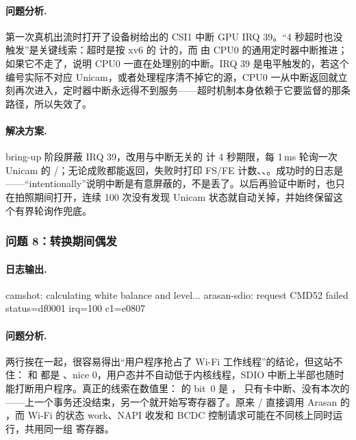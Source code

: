 \paragraph{问题分析.} 第一次真机出流时打开了设备树给出的 CSI1 中断 GPU IRQ 39。“4 秒超时也没触发”是关键线索：超时是按 xv6 的  计的，而  由 CPU0 的通用定时器中断推进；如果它不走了，说明 CPU0 一直在处理别的中断。IRQ 39 是电平触发的，若这个编号实际不对应 Unicam，或者处理程序清不掉它的源，CPU0 一从中断返回就立刻再次进入，定时器中断永远得不到服务——超时机制本身依赖于它要监督的那条路径，所以失效了。

\paragraph{解决方案.} bring-up 阶段屏蔽 IRQ 39，改用与中断无关的  计 4 秒期限，每 1\,ms 轮询一次 Unicam 的 /；无论成败都能返回，失败时打印 FS/FE 计数、、。成功时的日志是 ——“intentionally”说明中断是有意屏蔽的，不是丢了。以后再验证中断时，也只在拍照期间打开，连续 100 次没有发现 Unicam 状态就自动关掉，并始终保留这个有界轮询作兜底。

\subsubsection{问题 8：转换期间偶发 }

\paragraph{日志输出.}
\begin{txtcode}
camshot: calculating white balance and level...
arasan-sdio: request CMD52 failed status=df0001 irq=100 c1=e0807
\end{txtcode}

\paragraph{问题分析.} 两行挨在一起，很容易得出“用户程序抢占了 Wi-Fi 工作线程”的结论，但这站不住： 和  都是 、nice 0，用户态并不自动低于内核线程，SDIO 中断上半部也随时能打断用户程序。真正的线索在数值里： 的 bit~0 是 ， 只有卡中断、没有本次的 ——上一个事务还没结束，另一个就开始写寄存器了。原来 / 直接调用 Arasan 的 ，而 Wi-Fi 的状态 work、NAPI 收发和 BCDC 控制请求可能在不同核上同时运行，共用同一组  寄存器。

